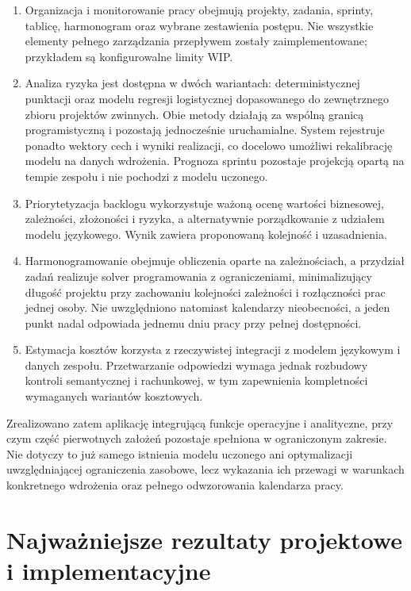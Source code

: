 \begin{enumerate}
    \item Organizacja i monitorowanie pracy obejmują projekty, zadania, sprinty, tablicę, harmonogram oraz wybrane zestawienia postępu. Nie wszystkie elementy pełnego zarządzania przepływem zostały zaimplementowane; przykładem są konfigurowalne limity WIP.

    \item Analiza ryzyka jest dostępna w dwóch wariantach: deterministycznej punktacji oraz modelu regresji logistycznej dopasowanego do zewnętrznego zbioru projektów zwinnych. Obie metody działają za wspólną granicą programistyczną i pozostają jednocześnie uruchamialne. System rejestruje ponadto wektory cech i wyniki realizacji, co docelowo umożliwi rekalibrację modelu na danych wdrożenia. Prognoza sprintu pozostaje projekcją opartą na tempie zespołu i nie pochodzi z modelu uczonego.

    \item Priorytetyzacja backlogu wykorzystuje ważoną ocenę wartości biznesowej, zależności, złożoności i ryzyka, a alternatywnie porządkowanie z udziałem modelu językowego. Wynik zawiera proponowaną kolejność i uzasadnienia.

    \item Harmonogramowanie obejmuje obliczenia oparte na zależnościach, a przydział zadań realizuje solver programowania z ograniczeniami, minimalizujący długość projektu przy zachowaniu kolejności zależności i rozłączności prac jednej osoby. Nie uwzględniono natomiast kalendarzy nieobecności, a jeden punkt nadal odpowiada jednemu dniu pracy przy pełnej dostępności.

    \item Estymacja kosztów korzysta z rzeczywistej integracji z modelem językowym i danych zespołu. Przetwarzanie odpowiedzi wymaga jednak rozbudowy kontroli semantycznej i rachunkowej, w tym zapewnienia kompletności wymaganych wariantów kosztowych.
\end{enumerate}

Zrealizowano zatem aplikację integrującą funkcje operacyjne i analityczne, przy czym część pierwotnych założeń pozostaje spełniona w ograniczonym zakresie. Nie dotyczy to już samego istnienia modelu uczonego ani optymalizacji uwzględniającej ograniczenia zasobowe, lecz wykazania ich przewagi w warunkach konkretnego wdrożenia oraz pełnego odwzorowania kalendarza pracy.

\section{Najważniejsze rezultaty projektowe i implementacyjne}


